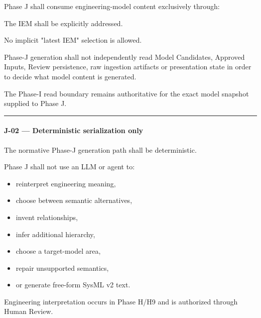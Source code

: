 Phase J shall consume engineering-model content exclusively through:

\begin{Shaded}
\begin{Highlighting}[]
\NormalTok{) }\OperatorTok{{-}\textgreater{}}
\end{Highlighting}
\end{Shaded}

The IEM shall be explicitly addressed.

No implicit "latest IEM" selection is allowed.

Phase-J generation shall not independently read Model Candidates, Approved Inputs, Review persistence, raw ingestion artifacts or presentation state in order to decide what model content is generated.

The Phase-I read boundary remains authoritative for the exact model snapshot supplied to Phase J.

\begin{center}\rule{0.5\linewidth}{0.5pt}\end{center}

\hypertarget{j-02--deterministic-serialization-only}{%
\paragraph{J-02 --- Deterministic serialization only}\label{j-02--deterministic-serialization-only}}

The normative Phase-J generation path shall be deterministic.

Phase J shall not use an LLM or agent to:

\begin{itemize}
\tightlist
\item
  reinterpret engineering meaning,
\item
  choose between semantic alternatives,
\item
  invent relationships,
\item
  infer additional hierarchy,
\item
  choose a target-model area,
\item
  repair unsupported semantics,
\item
  or generate free-form SysML v2 text.
\end{itemize}

Engineering interpretation occurs in Phase H/H9 and is authorized through Human Review.

